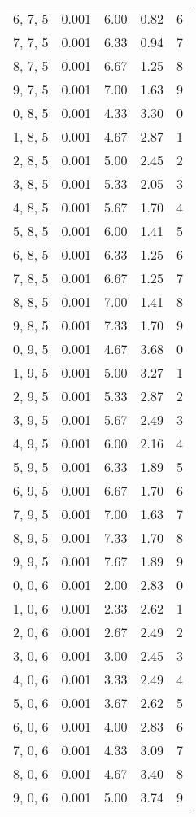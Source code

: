 \documentclass[12pt]{article}
\begin{document}
\begin{tabular}{c || c || c | c | c}
6, 7, 5 & 0.001 & 6.00 & 0.82 & 6 \\
7, 7, 5 & 0.001 & 6.33 & 0.94 & 7 \\
8, 7, 5 & 0.001 & 6.67 & 1.25 & 8 \\
9, 7, 5 & 0.001 & 7.00 & 1.63 & 9 \\
0, 8, 5 & 0.001 & 4.33 & 3.30 & 0 \\
1, 8, 5 & 0.001 & 4.67 & 2.87 & 1 \\
2, 8, 5 & 0.001 & 5.00 & 2.45 & 2 \\
3, 8, 5 & 0.001 & 5.33 & 2.05 & 3 \\
4, 8, 5 & 0.001 & 5.67 & 1.70 & 4 \\
5, 8, 5 & 0.001 & 6.00 & 1.41 & 5 \\
6, 8, 5 & 0.001 & 6.33 & 1.25 & 6 \\
7, 8, 5 & 0.001 & 6.67 & 1.25 & 7 \\
8, 8, 5 & 0.001 & 7.00 & 1.41 & 8 \\
9, 8, 5 & 0.001 & 7.33 & 1.70 & 9 \\
0, 9, 5 & 0.001 & 4.67 & 3.68 & 0 \\
1, 9, 5 & 0.001 & 5.00 & 3.27 & 1 \\
2, 9, 5 & 0.001 & 5.33 & 2.87 & 2 \\
3, 9, 5 & 0.001 & 5.67 & 2.49 & 3 \\
4, 9, 5 & 0.001 & 6.00 & 2.16 & 4 \\
5, 9, 5 & 0.001 & 6.33 & 1.89 & 5 \\
6, 9, 5 & 0.001 & 6.67 & 1.70 & 6 \\
7, 9, 5 & 0.001 & 7.00 & 1.63 & 7 \\
8, 9, 5 & 0.001 & 7.33 & 1.70 & 8 \\
9, 9, 5 & 0.001 & 7.67 & 1.89 & 9 \\
0, 0, 6 & 0.001 & 2.00 & 2.83 & 0 \\
1, 0, 6 & 0.001 & 2.33 & 2.62 & 1 \\
2, 0, 6 & 0.001 & 2.67 & 2.49 & 2 \\
3, 0, 6 & 0.001 & 3.00 & 2.45 & 3 \\
4, 0, 6 & 0.001 & 3.33 & 2.49 & 4 \\
5, 0, 6 & 0.001 & 3.67 & 2.62 & 5 \\
6, 0, 6 & 0.001 & 4.00 & 2.83 & 6 \\
7, 0, 6 & 0.001 & 4.33 & 3.09 & 7 \\
8, 0, 6 & 0.001 & 4.67 & 3.40 & 8 \\
9, 0, 6 & 0.001 & 5.00 & 3.74 & 9 \\

\end{tabular}
\end{document}
